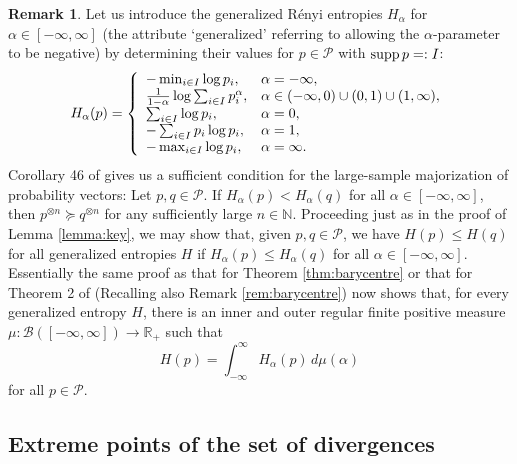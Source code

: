 \documentclass[12pt,a4paper,reqno]{amsart}
\theoremstyle{definition}
\newtheorem{remark}[proposition]{Remark}
\newcommand{\mc}[1]{\mathcal{#1}}
\newcommand{\N}{\mathbb N}
\newcommand{\R}{\mathbb R}
\let\originalleft\left
\let\originalright\right
\renewcommand{\left}{\mathopen{}\mathclose\bgroup\originalleft}
\renewcommand{\right}{\aftergroup\egroup\originalright}
\begin{document}
\begin{remark}
Let us introduce the generalized R\'{e}nyi entropies $H_\alpha$ for $\alpha\in[-\infty,\infty]$ (the attribute `generalized' referring to allowing the $\alpha$-parameter to be negative) by determining their values for $p\in\mc P$ with ${\rm supp}\,p=:I$:
$$
H_\alpha(p)=\left\{\begin{array}{ll}
-\min_{i\in I}\log{p_i},&\alpha=-\infty,\\
\frac{1}{1-\alpha}\log{\sum_{i\in I}p_i^\alpha},&\alpha\in(-\infty,0)\cup(0,1)\cup(1,\infty),\\
\sum_{i\in I}\log{p_i},&\alpha=0,\\
-\sum_{i\in I}p_i\log{p_i},&\alpha=1,\\
-\max_{i\in I}\log{p_i},&\alpha=\infty.
\end{array}\right.
$$
Corollary 46 of \cite{Farooq_et_al_2024} gives us a sufficient condition for the large-sample majorization of probability vectors: Let $p,q\in\mc P$. If $H_\alpha(p)<H_\alpha(q)$ for all $\alpha\in[-\infty,\infty]$, then $p^{\otimes n}\succeq q^{\otimes n}$ for any sufficiently large $n\in\N$. Proceeding just as in the proof of Lemma \ref{lemma:key}, we may show that, given $p,q\in\mc P$, we have $H(p)\leq H(q)$ for all generalized entropies $H$ if $H_\alpha(p)\leq H_\alpha(q)$ for all $\alpha\in[-\infty,\infty]$. Essentially the same proof as that for Theorem \ref{thm:barycentre} or that for Theorem 2 of \cite{Mu_et_al_2021} (Recalling also Remark \ref{rem:barycentre}) now shows that, for every generalized entropy $H$, there is an inner and outer regular finite positive measure $\mu:\mc B([-\infty,\infty])\to\R_+$ such that
$$
H(p)=\int_{-\infty}^\infty H_\alpha(p)\,d\mu(\alpha)
$$
for all $p\in\mc P$.
\end{remark}

\subsection{Extreme points of the set of divergences}\label{subsec:ext}
\end{document}
